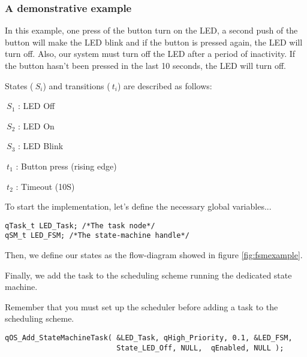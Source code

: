 

\subsubsection{A demonstrative example} \label{fsm_example}
In this example, one press of the button turn on the LED, a second push of the button will make the LED blink and if the button is pressed again, the LED will turn off. Also, our system must turn off the LED after a period of inactivity. If the button hasn't been pressed in the last 10 seconds, the LED will turn off. 

States ($\ S_i$) and transitions ($\ t_i$) are described as follows: 
\medskip
\begin{itemize}
\begin{minipage}{0.4\linewidth}
    \item $\ S_1$ : LED Off
    \item $\ S_2$ : LED On
    \item $\ S_3$ : LED Blink
\end{minipage}
\begin{minipage}{0.4\linewidth}
    \item $\ t_1$ : Button press (rising edge)
    \item $\ t_2$ : Timeout (10S)
\end{minipage}
\end{itemize}



To start the implementation, let's define the necessary global variables...

\begin{lstlisting}[style=CStyle]
qTask_t LED_Task; /*The task node*/
qSM_t LED_FSM; /*The state-machine handle*/
\end{lstlisting}

Then, we define our states as the flow-diagram showed in figure \ref{fig:fsmexample}.



Finally, we add the task to the scheduling scheme running the dedicated state machine.

Remember that you must set up the scheduler before adding a task to the scheduling scheme.
\medskip

\begin{lstlisting}[style=CStyle]
qOS_Add_StateMachineTask( &LED_Task, qHigh_Priority, 0.1, &LED_FSM,
                          State_LED_Off, NULL,  qEnabled, NULL );
\end{lstlisting}

